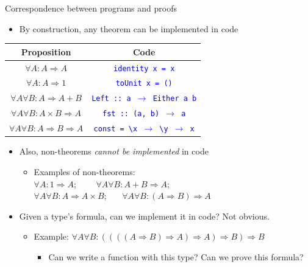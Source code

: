 \documentclass[english]{beamer}
\providecommand{\tabularnewline}{\\}
\begin{document}
\begin{frame}{Correspondence between programs and proofs}

\begin{itemize}
\item By construction, any theorem can be implemented in code
\end{itemize}
\begin{center}
\begin{tabular}{|c|c|}
\hline 
\textbf{Proposition} &
\textbf{Code}\tabularnewline
\hline 
\hline 
$\forall A:A\Rightarrow A$ &
\texttt{\textcolor{blue}{\footnotesize{}identity x = x}}\tabularnewline
\hline 
$\forall A:A\Rightarrow1$ &
\texttt{\textcolor{blue}{\footnotesize{}toUnit x = ()}}\tabularnewline
\hline 
$\forall A\forall B:A\Rightarrow A+B$ &
\texttt{\textcolor{blue}{\footnotesize{}Left :: a $\rightarrow$ Either
a b}}\tabularnewline
\hline 
$\forall A\forall B:A\times B\Rightarrow A$ &
\texttt{\textcolor{blue}{\footnotesize{}fst :: (a, b) $\rightarrow$
a}}\tabularnewline
\hline 
$\forall A\forall B:A\Rightarrow B\Rightarrow A$ &
\texttt{\textcolor{blue}{\footnotesize{}const = \textbackslash{}x
$\rightarrow$ \textbackslash{}y $\rightarrow$ x}}\tabularnewline
\hline 
\end{tabular}
\par\end{center}
\begin{itemize}
\item Also, non-theorems \emph{cannot be implemented} in code 
\begin{itemize}
\item Examples of non-theorems:\\
 $\forall A:1\Rightarrow A$; \  \  $\quad\forall A\forall B:A+B\Rightarrow A$;
\\
$\forall A\forall B:A\Rightarrow A\times B$; \  $\quad\forall A\forall B:(A\Rightarrow B)\Rightarrow A$
\end{itemize}
\item Given a type's formula, can we implement it in code? Not obvious.
\begin{itemize}
\item Example: $\forall A\forall B:((((A\Rightarrow B)\Rightarrow A)\Rightarrow A)\Rightarrow B)\Rightarrow B$
\begin{itemize}
\item Can we write a function with this type? Can we prove this formula?
\end{itemize}
\end{itemize}
\end{itemize}
\end{frame}
\end{document}
